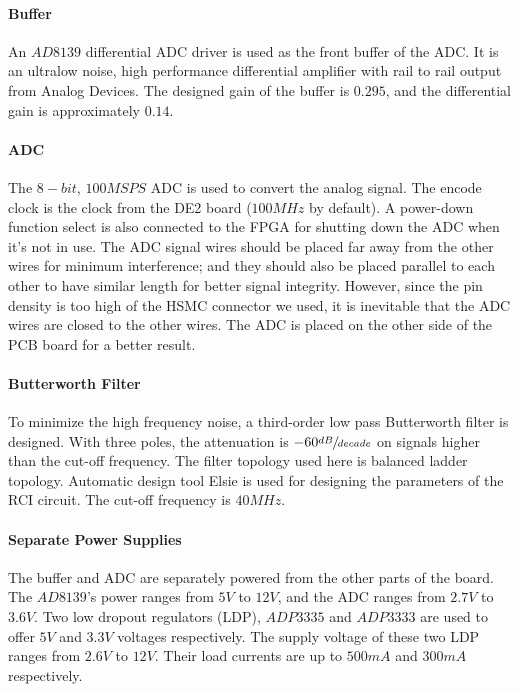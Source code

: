 \paragraph{Buffer}
An $AD8139$ differential ADC driver is used as the front buffer of the ADC. It is an ultralow noise, high performance differential amplifier with rail to rail output from Analog Devices. The designed gain of the buffer is $0.295$, and the differential gain is approximately $0.14$.

\paragraph{ADC}
The $8-bit$, $100MSPS$ ADC is used to convert the analog signal. The encode clock is the clock from the DE2 board ($100MHz$ by default). A power-down function select is also connected to the FPGA for shutting down the ADC when it’s not in use. The ADC signal wires should be placed far away from the other wires for minimum interference; and they should also be placed parallel to each other to have similar length for better signal integrity. However, since the pin density is too high of the HSMC connector we used, it is inevitable that the ADC wires are closed to the other wires. The ADC is placed on the other side of the PCB board for a better result.


\paragraph{Butterworth Filter}
To minimize the high frequency noise, a third-order low pass Butterworth filter is designed. With three poles, the attenuation is $-60 \sfrac{dB}{decade}$ on signals higher than the cut-off frequency. The filter topology used here is balanced ladder topology. Automatic design tool Elsie is used for designing the parameters of the RCI circuit. The cut-off frequency is $40MHz$.


\paragraph{Separate Power Supplies}
The buffer and ADC are separately powered from the other parts of the board. The $AD8139$’s power ranges from $5V$ to $12V$, and the ADC ranges from $2.7V$ to $3.6V$. Two low dropout regulators (LDP), $ADP3335$ and $ADP3333$ are used to offer $5V$ and $3.3V$ voltages respectively. The supply voltage of these two LDP ranges from $2.6V$ to $12V$. Their load currents are up to $500mA$ and $300mA$ respectively.


